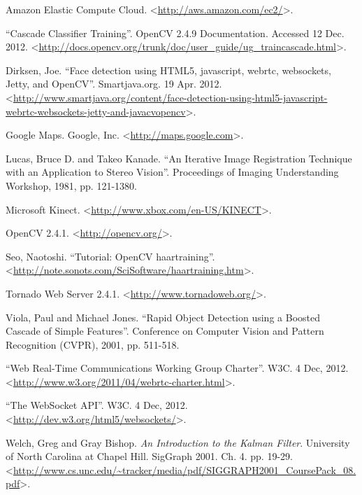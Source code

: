 \documentclass[12pt]{article}
\begin{document}
\begin{thebibliography}{99}

Amazon Elastic Compute Cloud. \textless\url{http://aws.amazon.com/ec2/}\textgreater.

  ``Cascade Classifier Training''. OpenCV 2.4.9 Documentation. Accessed 12 Dec. 2012. \textless\url{http://docs.opencv.org/trunk/doc/user_guide/ug_traincascade.html}\textgreater.

Dirksen, Joe. ``Face detection using HTML5, javascript, webrtc, websockets, Jetty, and OpenCV''. Smartjava.org. 19 Apr. 2012. \textless\url{http://www.smartjava.org/content/face-detection-using-html5-javascript-webrtc-websockets-jetty-and-javacvopencv}\textgreater.

Google Maps. Google, Inc. \textless\url{http://maps.google.com}\textgreater.

Lucas, Bruce D. and Takeo Kanade. ``An Iterative Image Registration Technique with an Application to Stereo Vision''. Proceedings of Imaging Understanding Workshop, 1981, pp. 121-1380. 

Microsoft Kinect. \textless\url{http://www.xbox.com/en-US/KINECT}\textgreater.

OpenCV 2.4.1. \textless\url{http://opencv.org/}\textgreater.

Seo, Naotoshi. ``Tutorial: OpenCV haartraining''. \textless\url{http://note.sonots.com/SciSoftware/haartraining.htm}\textgreater.

Tornado Web Server 2.4.1. \textless\url{http://www.tornadoweb.org/}\textgreater.

Viola, Paul and Michael Jones. ``Rapid Object Detection using a Boosted Cascade of Simple Features''. Conference on Computer Vision and Pattern Recognition (CVPR), 2001, pp. 511-518. 

``Web Real-Time Communications Working Group Charter''. W3C. 4 Dec, 2012. \textless\url{http://www.w3.org/2011/04/webrtc-charter.html}\textgreater.

``The WebSocket API''. W3C. 4 Dec, 2012. \textless\url{http://dev.w3.org/html5/websockets/}\textgreater.

Welch, Greg and Gray Bishop. \emph{An Introduction to the Kalman Filter}. University of North Carolina at Chapel Hill. SigGraph 2001. Ch. 4. pp. 19-29. \textless\url{http://www.cs.unc.edu/~tracker/media/pdf/SIGGRAPH2001_CoursePack_08.pdf}\textgreater.

\end{thebibliography}
\end{document}
